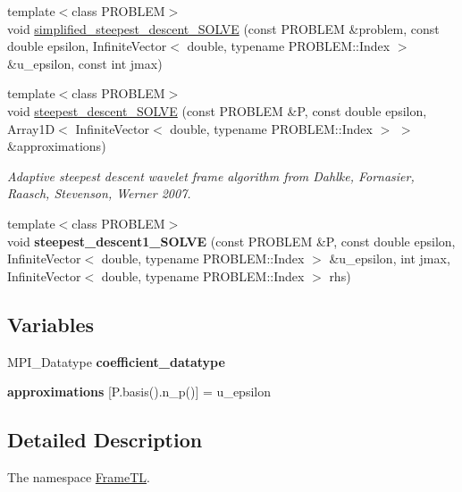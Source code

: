 \begin{CompactItemize}
\item 
{\footnotesize template$<$class PROBLEM$>$ }\\void \hyperlink{namespaceFrameTL_c04ff1f80c162c3369928a2b45402beb}{simplified\_\-steepest\_\-descent\_\-SOLVE} (const PROBLEM \&problem, const double epsilon, InfiniteVector$<$ double, typename PROBLEM::Index $>$ \&u\_\-epsilon, const int jmax)
\item 
{\footnotesize template$<$class PROBLEM$>$ }\\void \hyperlink{namespaceFrameTL_b98b858d0561768f9494ac7f962a6857}{steepest\_\-descent\_\-SOLVE} (const PROBLEM \&P, const double epsilon, Array1D$<$ InfiniteVector$<$ double, typename PROBLEM::Index $>$ $>$ \&approximations)
\begin{CompactList}\small\item\em Adaptive steepest descent wavelet frame algorithm from Dahlke, Fornasier, Raasch, Stevenson, Werner 2007. \item\end{CompactList}\item 
\hypertarget{namespaceFrameTL_bb9619e1ba041c247f306eb45f1d0e90}{
{\footnotesize template$<$class PROBLEM$>$ }\\void \textbf{steepest\_\-descent1\_\-SOLVE} (const PROBLEM \&P, const double epsilon, InfiniteVector$<$ double, typename PROBLEM::Index $>$ \&u\_\-epsilon, int jmax, InfiniteVector$<$ double, typename PROBLEM::Index $>$ rhs)}
\label{namespaceFrameTL_bb9619e1ba041c247f306eb45f1d0e90}

\end{CompactItemize}
\subsection*{Variables}
\begin{CompactItemize}
\item 
\hypertarget{namespaceFrameTL_ed8caef1981377375248b70b9df6b085}{
MPI\_\-Datatype \textbf{coefficient\_\-datatype}}
\label{namespaceFrameTL_ed8caef1981377375248b70b9df6b085}

\item 
\hypertarget{namespaceFrameTL_ecdb4ced7f7d4e5fde0db90a76dd3741}{
\textbf{approximations} \mbox{[}P.basis().n\_\-p()\mbox{]} = u\_\-epsilon}
\label{namespaceFrameTL_ecdb4ced7f7d4e5fde0db90a76dd3741}

\end{CompactItemize}


\subsection{Detailed Description}
The namespace \hyperlink{namespaceFrameTL}{FrameTL}. 

